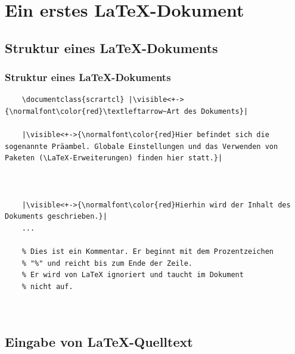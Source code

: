 \section{Ein erstes \LaTeX-Dokument}
\subsection{Struktur eines \LaTeX-Dokuments}

\begin{frame}[fragile]
	\frametitle{Struktur eines \LaTeX-Dokuments}
	\lstset{frame=L, numbers=left, xleftmargin=0.5cm}
	\only<+->{}
	\begin{lstlisting}
	\documentclass{scrartcl} |\visible<+->{\normalfont\color{red}\textleftarrow~Art des Dokuments}|
	
	|\visible<+->{\normalfont\color{red}Hier befindet sich die sogenannte Präambel. Globale Einstellungen und das Verwenden von Paketen (\LaTeX-Erweiterungen) finden hier statt.}|
	
	
	
	|\visible<+->{\normalfont\color{red}Hierhin wird der Inhalt des Dokuments geschrieben.}|
	...
	
	% Dies ist ein Kommentar. Er beginnt mit dem Prozentzeichen
	% "%" und reicht bis zum Ende der Zeile.
	% Er wird von LaTeX ignoriert und taucht im Dokument
	% nicht auf.
	
	
	\end{lstlisting}
\end{frame}

\subsection{Eingabe von \LaTeX-Quelltext}

